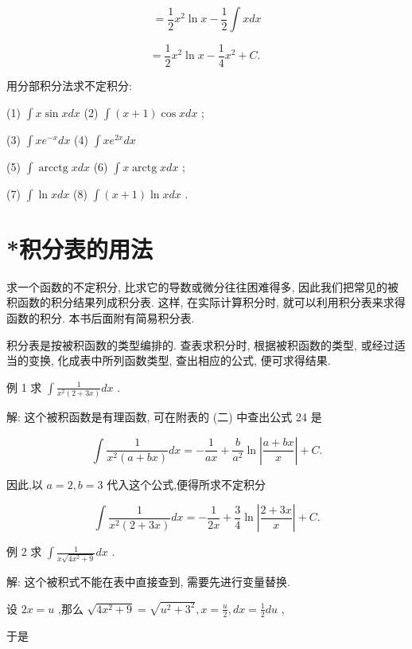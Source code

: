 \documentclass[lang=cn,newtx,10pt,scheme=chinese]{elegantbook}
\begin{document}
\[
= \frac{1}{2}{x}^{2}\ln x - \frac{1}{2}\int {xdx}
\]

\[
= \frac{1}{2}{x}^{2}\ln x - \frac{1}{4}{x}^{2} + C\text{. }
\]

\begin{problemset}[练习]

\item 用分部积分法求不定积分:

(1) \(\int x\sin {xdx}\) (2) \(\int \left( {x + 1}\right) \cos {xdx}\) ;

(3) \(\int x{e}^{-x}{dx}\) (4) \(\int x{e}^{2x}{dx}\)

(5) \(\int \operatorname{arcctg}{xdx}\) (6) \(\int x\operatorname{arctg}{xdx}\) ;

(7) \(\int \ln {xdx}\) (8) \(\int \left( {x + 1}\right) \ln {xdx}\) .

\end{problemset}

\section*{*积分表的用法}

求一个函数的不定积分, 比求它的导数或微分往往困难得多, 因此我们把常见的被积函数的积分结果列成积分表. 这样, 在实际计算积分时, 就可以利用积分表来求得函数的积分. 本书后面附有简易积分表.

积分表是按被积函数的类型编排的. 查表求积分时, 根据被积函数的类型, 或经过适当的变换, 化成表中所列函数类型, 查出相应的公式, 便可求得结果.

例 1 求 \(\int \frac{1}{{x}^{2}\left( {2 + {3x}}\right) }{dx}\) .

解: 这个被积函数是有理函数, 可在附表的 (二) 中查出公式 24 是

\[
\int \frac{1}{{x}^{2}\left( {a + {bx}}\right) }{dx} = - \frac{1}{ax} + \frac{b}{{a}^{2}}\ln \left| \frac{a + {bx}}{x}\right| + C.
\]

因此,以 \(a = 2,b = 3\) 代入这个公式,便得所求不定积分

\[
\int \frac{1}{{x}^{2}\left( {2 + {3x}}\right) }{dx} = - \frac{1}{2x} + \frac{3}{4}\ln \left| \frac{2 + {3x}}{x}\right| + C.
\]

例 2 求 \(\int \frac{1}{x\sqrt{4{x}^{2} + 9}}{dx}\) .

解: 这个被积式不能在表中直接查到, 需要先进行变量替换.

设 \({2x} = u\) ,那么 \(\sqrt{4{x}^{2} + 9} = \sqrt{{u}^{2} + {3}^{2}},x = \frac{u}{2},{dx} = \frac{1}{2}{du}\) ,

于是
\end{document}
